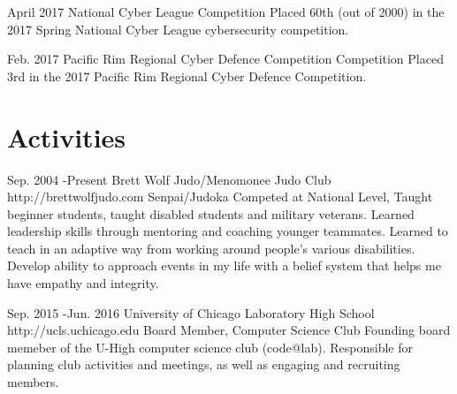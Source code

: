 \documentclass[10pt]{article} %
\begin{document}
\award
{April 2017}
{ }
{National Cyber League}
{}
{Competition}
{Placed 60th (out of 2000) in the 2017 Spring National Cyber League cybersecurity competition.}


\award
{Feb. 2017}
{ }
{Pacific Rim Regional Cyber Defence Competition}
{}
{Competition}
{Placed 3rd in the 2017 Pacific Rim Regional Cyber Defence Competition.}


\section{Activities}
\activity
{Sep. 2004 -}{Present}
{Brett Wolf Judo/Menomonee Judo Club}
{http://brettwolfjudo.com}
{Senpai/Judoka}
{Competed at National Level, Taught beginner students, taught disabled students and military veterans. Learned leadership skills through mentoring and coaching younger teammates.  Learned to teach in an adaptive way from working around people’s various disabilities.  Develop ability to approach events in my life with a belief system that helps me have empathy and integrity.}

\activity
{Sep. 2015 -}{Jun. 2016}
{University of Chicago Laboratory High School}
{http://ucls.uchicago.edu}
{Board Member, Computer Science Club}
{Founding board memeber of the U-High computer science club (code@lab). Responsible for planning club activities and meetings, as well as engaging and recruiting members.}
\end{document}
